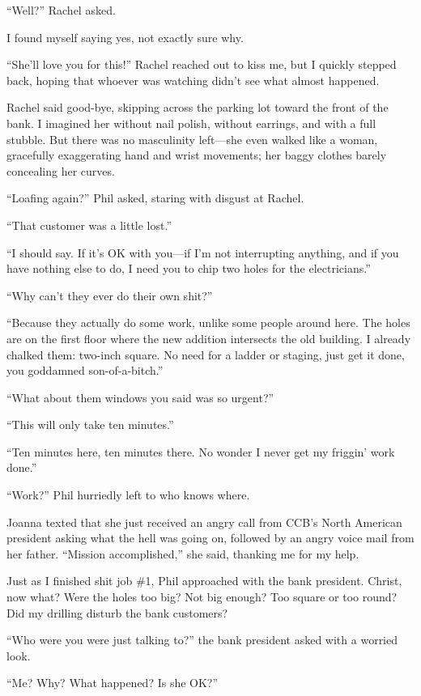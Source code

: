 ``Well?'' Rachel asked.

I found myself saying yes, not exactly sure why.

``She'll love you for this!'' Rachel reached out to kiss me, but I
quickly stepped back, hoping that whoever was watching didn't see what
almost happened.

Rachel said good-bye, skipping across the parking lot toward the front
of the bank. I imagined her without nail polish, without earrings, and
with a full stubble. But there was no masculinity left---she even walked
like a woman, gracefully exaggerating hand and wrist movements; her
baggy clothes barely concealing her curves.

``Loafing again?'' Phil asked, staring with disgust at Rachel.

``That customer was a little lost.''

``I should say. If it's OK with you---if I'm not interrupting anything,
and if you have nothing else to do, I need you to chip two holes for the
electricians.''

``Why can't they ever do their own shit?''

``Because they actually do some work, unlike some people around here.
The holes are on the first floor where the new addition intersects the
old building. I already chalked them: two-inch square. No need for a
ladder or staging, just get it done, you goddamned son-of-a-bitch.''

``What about them windows you said was so urgent?''

``This will only take ten minutes.''

``Ten minutes here, ten minutes there. No wonder I never get my friggin'
work done.''

``Work?'' Phil hurriedly left to who knows where.

Joanna texted that she just received an angry call from CCB's North
American president asking what the hell was going on, followed by an
angry voice mail from her father. ``Mission accomplished,'' she said,
thanking me for my help.

Just as I finished shit job \#1, Phil approached with the bank
president. Christ, now what? Were the holes too big? Not big enough? Too
square or too round? Did my drilling disturb the bank customers?

``Who were you were just talking to?'' the bank president asked with a
worried look.

``Me? Why? What happened? Is she OK?''

